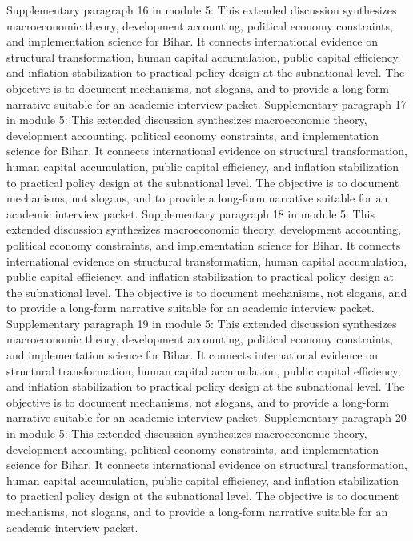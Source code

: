 \documentclass[preprint,12pt]{elsarticle}
\begin{document}
Supplementary paragraph 16 in module 5: This extended discussion synthesizes macroeconomic theory, development accounting, political economy constraints, and implementation science for Bihar. It connects international evidence on structural transformation, human capital accumulation, public capital efficiency, and inflation stabilization to practical policy design at the subnational level. The objective is to document mechanisms, not slogans, and to provide a long-form narrative suitable for an academic interview packet.
Supplementary paragraph 17 in module 5: This extended discussion synthesizes macroeconomic theory, development accounting, political economy constraints, and implementation science for Bihar. It connects international evidence on structural transformation, human capital accumulation, public capital efficiency, and inflation stabilization to practical policy design at the subnational level. The objective is to document mechanisms, not slogans, and to provide a long-form narrative suitable for an academic interview packet.
Supplementary paragraph 18 in module 5: This extended discussion synthesizes macroeconomic theory, development accounting, political economy constraints, and implementation science for Bihar. It connects international evidence on structural transformation, human capital accumulation, public capital efficiency, and inflation stabilization to practical policy design at the subnational level. The objective is to document mechanisms, not slogans, and to provide a long-form narrative suitable for an academic interview packet.
Supplementary paragraph 19 in module 5: This extended discussion synthesizes macroeconomic theory, development accounting, political economy constraints, and implementation science for Bihar. It connects international evidence on structural transformation, human capital accumulation, public capital efficiency, and inflation stabilization to practical policy design at the subnational level. The objective is to document mechanisms, not slogans, and to provide a long-form narrative suitable for an academic interview packet.
Supplementary paragraph 20 in module 5: This extended discussion synthesizes macroeconomic theory, development accounting, political economy constraints, and implementation science for Bihar. It connects international evidence on structural transformation, human capital accumulation, public capital efficiency, and inflation stabilization to practical policy design at the subnational level. The objective is to document mechanisms, not slogans, and to provide a long-form narrative suitable for an academic interview packet.
\end{document}
